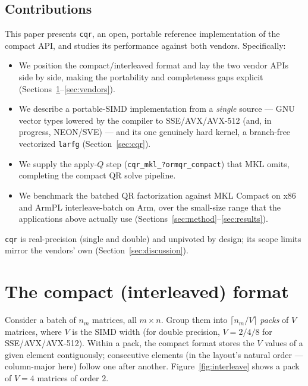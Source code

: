 \documentclass[11pt]{article}
\newcommand{\code}[1]{\texttt{#1}}
\newcommand{\cqr}{\mbox{\texttt{cqr}}}
\begin{document}
\subsection{Contributions}
This paper presents \cqr{}, an open, portable reference implementation of the
compact API, and studies its performance against both vendors. Specifically:
\begin{itemize}\itemsep2pt
  \item We position the compact/interleaved format and lay the two vendor APIs
        side by side, making the portability and completeness gaps explicit
        (Sections~\ref{sec:format}--\ref{sec:vendors}).
  \item We describe a portable-SIMD implementation from a \emph{single} source
        --- GNU vector types lowered by the compiler to SSE/AVX/AVX-512 (and, in
        progress, NEON/SVE) --- and its one genuinely hard kernel, a branch-free
        vectorized \code{larfg} (Section~\ref{sec:cqr}).
  \item We supply the apply-$Q$ step (\code{cqr\_mkl\_?ormqr\_compact}) that MKL
        omits, completing the compact QR solve pipeline.
  \item We benchmark the batched QR factorization against MKL Compact on x86 and
        ArmPL interleave-batch on Arm, over the small-size range that the
        applications above actually use (Sections~\ref{sec:method}--\ref{sec:results}).
\end{itemize}
\cqr{} is real-precision (single and double) and unpivoted by design; its scope
limits mirror the vendors' own (Section~\ref{sec:discussion}).

\section{The compact (interleaved) format}
\label{sec:format}

Consider a batch of $n_m$ matrices, all $m\times n$. Group them into
$\lceil n_m/V\rceil$ \emph{packs} of $V$ matrices, where $V$ is the SIMD width
(for double precision, $V=2/4/8$ for SSE/AVX/AVX-512). Within a pack, the compact
format stores the $V$ values of a given element contiguously; consecutive
elements (in the layout's natural order --- column-major here) follow one after
another. Figure~\ref{fig:interleave} shows a pack of $V=4$ matrices of order $2$.
\end{document}
